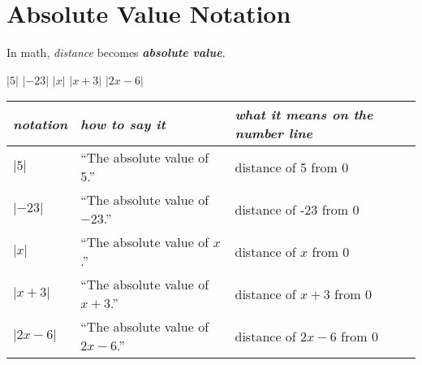 
\section{Absolute Value Notation}

\begin{tcolorbox}[center,width=5in,parbox=false,]
    \centering
    In math, {\itshape distance} becomes {\bfseries\itshape absolute value}.\par
    \large
    \hfil $|5|$ \hfil $|-23|$ \hfil $|x|$ \hfil $|x+3|$ \hfil $|2x-6|$ \hfil {}
\end{tcolorbox}

\begin{center}
    \renewcommand{\arraystretch}{1.5}
    \small
    \begin{tabular}{p{0.75in}ll}
        \toprule
        {\itshape notation} 
            & {\itshape how to say it}
            & {\itshape what it means on the number line} \\
        \midrule
        $|5|$  
            & ``The absolute value of 5.''
            &  distance of 5 from 0 \\
        $|-23|$  
        & ``The absolute value of $-23$.''
        &  distance of -23 from 0  \\
        $|x|$  
        & ``The absolute value of $x$.''
        &  distance of $x$ from 0 \\
        $|x+3|$  
        & ``The absolute value of $x+3$.''
        &  distance of $x+3$ from 0 \\
        $|2x-6|$  
        & ``The absolute value of $2x-6$.''
        &  distance of $2x-6$ from 0 \\
        \bottomrule
    \end{tabular}
\end{center}

